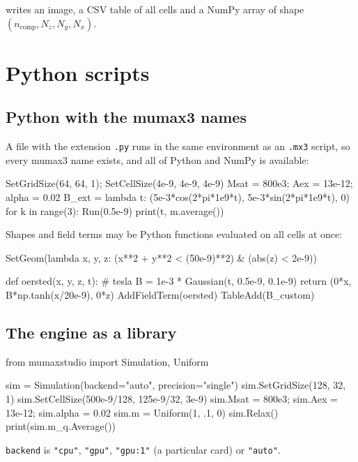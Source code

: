 \documentclass[11pt,a4paper,oneside]{book}
\newcommand{\code}[1]{\texttt{#1}}
\renewcommand{\_}{\textunderscore\allowbreak}
\begin{document}
writes an image, a CSV table of all cells and a NumPy array of shape $(n_, N_z, N_y, N_x)$.

\chapter{Python scripts}\label{ch:python}

\section{Python with the mumax3 names}

A file with the extension \code{.py} runs in the same environment as an \code{.mx3} script, so every mumax3
name exists, and all of Python and NumPy is available:
\begin{pycode}
SetGridSize(64, 64, 1); SetCellSize(4e-9, 4e-9, 4e-9)
Msat = 800e3; Aex = 13e-12; alpha = 0.02
B_ext = lambda t: (5e-3*cos(2*pi*1e9*t), 5e-3*sin(2*pi*1e9*t), 0)
for k in range(3):
    Run(0.5e-9)
    print(t, m.average())
\end{pycode}
Shapes and field terms may be Python functions evaluated on all cells at once:
\begin{pycode}
SetGeom(lambda x, y, z: (x**2 + y**2 < (50e-9)**2) & (abs(z) < 2e-9))

def oersted(x, y, z, t):            # tesla
    B = 1e-3 * Gaussian(t, 0.5e-9, 0.1e-9)
    return (0*x, B*np.tanh(x/20e-9), 0*z)
AddFieldTerm(oersted)
TableAdd(B_custom)
\end{pycode}

\section{The engine as a library}

\begin{pycode}
from mumaxstudio import Simulation, Uniform

sim = Simulation(backend="auto", precision="single")
sim.SetGridSize(128, 32, 1)
sim.SetCellSize(500e-9/128, 125e-9/32, 3e-9)
sim.Msat = 800e3; sim.Aex = 13e-12; sim.alpha = 0.02
sim.m = Uniform(1, .1, 0)
sim.Relax()
print(sim.m_q.Average())
\end{pycode}
\code{backend} is \code{"cpu"}, \code{"gpu"}, \code{"gpu:1"} (a particular card) or \code{"auto"}.
\end{document}
